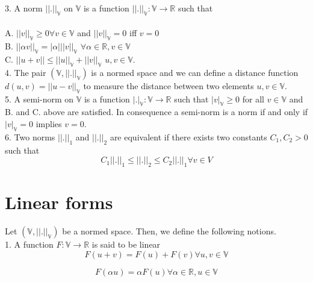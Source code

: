 \documentclass[a4paper]{book}
\begin{document}
3. A norm $||.||_\mathbb{V}$ on $\mathbb{V}$ is a function $||.||_\mathbb{V} : \mathbb{V} \rightarrow \mathbb{R}$ such that\\ 
\\
A. $||v||_\mathbb{V} \geq 0 \forall v \in \mathbb{V}$ and $||v||_\mathbb{V} = 0$ iff $v=0$\\
B. $||\alpha v||_\mathbb{V} = |\alpha| ||v||_\mathbb{V}$  $\forall \alpha \in \mathbb{R}, v \in \mathbb{V}$\\
C. $||u+v|| \leq ||u||_\mathbb{V} + ||v||_\mathbb{V}$ $u,v \in \mathbb{V}$.\\

4. The pair $(\mathbb{V},||.||_\mathbb{V})$ is a normed space and we can define a distance function $d(u,v) = ||u-v||_\mathbb{V}$ to measure the distance between two elements $u,v \in \mathbb{V}$.\\

5. A semi-norm on $\mathbb{V}$ is a function $|.|_\mathbb{V} : \mathbb{V} \rightarrow \mathbb{R}$ such that $|v|_\mathbb{V} \geq 0$ for all $v \in \mathbb{V}$ and B. and C. above are satisfied. In consequence a semi-norm is a norm if and only if $|v|_\mathbb{V} = 0$ implies  $v = 0$.\\

6. Two norms $||.||_1$ and $||.||_2$ are equivalent if there exists two constants $C_1,C_2 > 0$ such that \\

\begin{equation} \label{norm_equivalent}
C_1||.||_1 \leq ||.||_2 \leq C_2 ||.||_1 \forall v \in V
\end{equation}

\section{Linear forms}

Let $(\mathbb{V,||.||_\mathbb{V}})$ be a normed space. Then, we define the following notions.\\

1. A function $F : \mathbb{V} \rightarrow \mathbb{R}$ is said to be linear
\begin{equation} 
F(u+v) = F(u) + F(v) \forall u,v \in \mathbb{V} 
\end{equation}

\begin{equation} 
F(\alpha u) = \alpha F(u) \forall \alpha \in \mathbb{R}, u \in \mathbb{V}
\end{equation}
\end{document}
